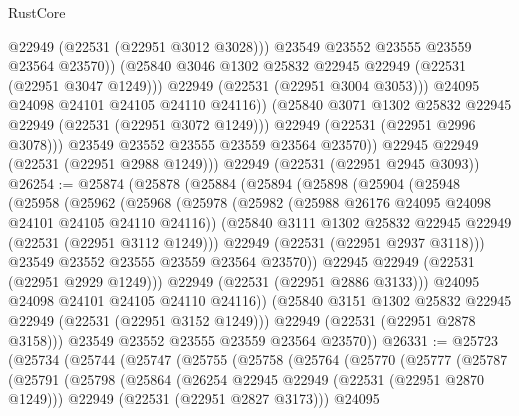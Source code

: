 \begin{lexlean}{RustCore}
\begin{coremodule}
                        @22949
                        (@22531 (@22951 @3012 @3028)))
                      @23549
                      @23552
                      @23555
                      @23559
                      @23564
                      @23570))
                  (@25840 @3046 @1302 @25832 @22945 @22949 (@22531 (@22951 @3047 @1249)))
                  @22949
                  (@22531 (@22951 @3004 @3053)))
                @24095
                @24098
                @24101
                @24105
                @24110
                @24116))
            (@25840 @3071 @1302 @25832 @22945 @22949 (@22531 (@22951 @3072 @1249)))
            @22949
            (@22531 (@22951 @2996 @3078)))
          @23549
          @23552
          @23555
          @23559
          @23564
          @23570))
      @22945
      @22949
      (@22531 (@22951 @2988 @1249)))
    @22949
    (@22531 (@22951 @2945 @3093))
@26254 := @25874
    (@25878
      (@25884
        (@25894
          (@25898
            (@25904
              (@25948
                (@25958
                  (@25962
                    (@25968
                      (@25978
                        (@25982 (@25988 @26176 @24095 @24098 @24101 @24105 @24110 @24116))
                        (@25840 @3111 @1302 @25832 @22945 @22949 (@22531 (@22951 @3112 @1249)))
                        @22949
                        (@22531 (@22951 @2937 @3118)))
                      @23549
                      @23552
                      @23555
                      @23559
                      @23564
                      @23570))
                  @22945
                  @22949
                  (@22531 (@22951 @2929 @1249)))
                @22949
                (@22531 (@22951 @2886 @3133)))
              @24095
              @24098
              @24101
              @24105
              @24110
              @24116))
          (@25840 @3151 @1302 @25832 @22945 @22949 (@22531 (@22951 @3152 @1249)))
          @22949
          (@22531 (@22951 @2878 @3158)))
        @23549
        @23552
        @23555
        @23559
        @23564
        @23570))
@26331 := @25723
    (@25734
      (@25744
        (@25747
          (@25755
            (@25758
              (@25764
                (@25770
                  (@25777
                    (@25787
                      (@25791
                        (@25798
                          (@25864
                            (@26254 @22945 @22949 (@22531 (@22951 @2870 @1249)))
                            @22949
                            (@22531 (@22951 @2827 @3173)))
                          @24095

\end{coremodule}
\end{lexlean}
